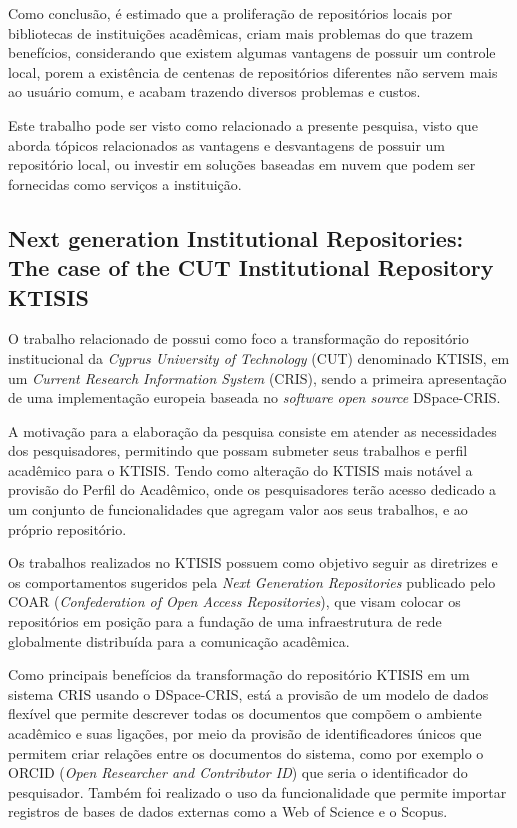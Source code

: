 Como conclusão, é estimado que a proliferação de repositórios locais por bibliotecas de
instituições acadêmicas, criam mais problemas do que trazem benefícios, considerando
que existem algumas vantagens de possuir um controle local, porem a existência de
centenas de repositórios diferentes não servem mais ao usuário comum, e acabam trazendo
diversos problemas e custos.

Este trabalho pode ser visto como relacionado a presente pesquisa, visto que aborda
tópicos relacionados as vantagens e desvantagens de possuir um repositório local, ou
investir em soluções baseadas em nuvem que podem ser fornecidas como serviços a instituição.

\subsection{Next generation Institutional Repositories: The case of the CUT Institutional Repository KTISIS}

O trabalho relacionado de \cite{Zervas:2019} possui como foco a transformação
do repositório institucional da \emph{Cyprus University of Technology} (CUT) denominado
KTISIS, em um \emph{Current Research Information System} (CRIS), sendo a primeira
apresentação de uma implementação europeia baseada no \emph{software open source}
DSpace-CRIS.

A motivação para a elaboração da pesquisa consiste em atender as necessidades
dos pesquisadores, permitindo que possam submeter seus trabalhos e perfil acadêmico
para o KTISIS. Tendo como alteração do KTISIS mais notável a provisão do Perfil do Acadêmico,
onde os pesquisadores terão acesso dedicado a um conjunto de funcionalidades que
agregam valor aos seus trabalhos, e ao próprio repositório.

Os trabalhos realizados no KTISIS possuem como objetivo seguir as diretrizes e
os comportamentos sugeridos pela \emph{Next Generation Repositories} publicado
pelo COAR (\emph{Confederation of Open Access Repositories}), que visam
colocar os repositórios em posição para a fundação de uma infraestrutura de rede
globalmente distribuída para a comunicação acadêmica.

Como principais benefícios da transformação do repositório KTISIS em um sistema
CRIS usando o DSpace-CRIS, está a provisão de um modelo de dados flexível
que permite descrever todas os documentos que compõem o ambiente acadêmico e suas
ligações, por meio da provisão de identificadores únicos que permitem criar relações
entre os documentos do sistema, como por exemplo o ORCID (\emph{Open Researcher and Contributor ID})
que seria o identificador do pesquisador. Também foi realizado o uso da
funcionalidade que permite importar registros de bases de dados externas
como a Web of Science e o Scopus.

